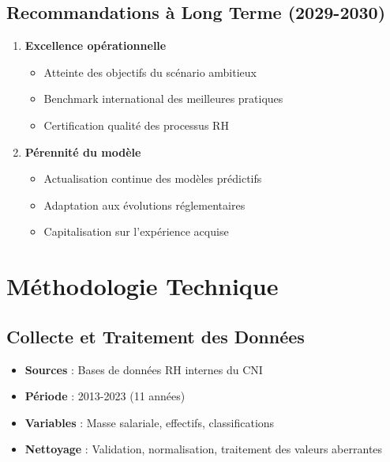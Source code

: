 \documentclass[12pt,a4paper]{article}
\begin{document}
\subsection{Recommandations à Long Terme (2029-2030)}
\begin{enumerate}
    \item \textbf{Excellence opérationnelle}
    \begin{itemize}
        \item Atteinte des objectifs du scénario ambitieux
        \item Benchmark international des meilleures pratiques
        \item Certification qualité des processus RH
    \end{itemize}
    
    \item \textbf{Pérennité du modèle}
    \begin{itemize}
        \item Actualisation continue des modèles prédictifs
        \item Adaptation aux évolutions réglementaires
        \item Capitalisation sur l'expérience acquise
    \end{itemize}
\end{enumerate}

\newpage

\section{Méthodologie Technique}

\subsection{Collecte et Traitement des Données}
\begin{itemize}
    \item \textbf{Sources} : Bases de données RH internes du CNI
    \item \textbf{Période} : 2013-2023 (11 années)
    \item \textbf{Variables} : Masse salariale, effectifs, classifications
    \item \textbf{Nettoyage} : Validation, normalisation, traitement des valeurs aberrantes
\end{itemize}
\end{document}
